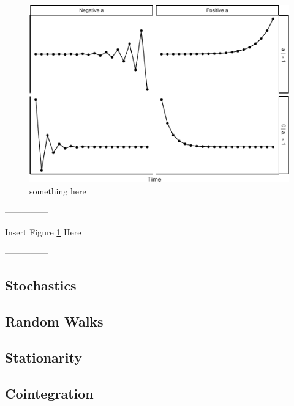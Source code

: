 \documentclass[english,,man]{apa6}
\theoremstyle{definition}
\theoremstyle{definition}
\theoremstyle{definition}
\theoremstyle{remark}
\begin{document}
\begin{figure}
\centering
\includegraphics{compile_cp_files/figure-latex/unnamed-chunk-6-1.pdf}
\caption{\label{fig:unnamed-chunk-6}something here\label{dynamics_plot}}
\end{figure}

\begin{center}

---------------

Insert Figure \ref{dynamics_plot} Here

---------------

\end{center}

\hypertarget{stochastics}{%
\subsection{Stochastics}\label{stochastics}}

\hypertarget{random-walks}{%
\subsection{Random Walks}\label{random-walks}}

\hypertarget{stationarity}{%
\subsection{Stationarity}\label{stationarity}}

\hypertarget{cointegration}{%
\subsection{Cointegration}\label{cointegration}}
\end{document}
